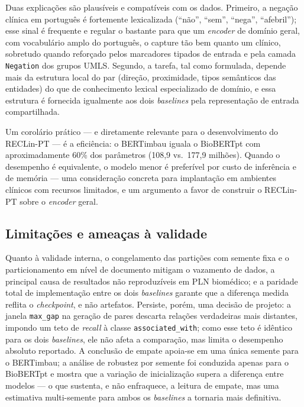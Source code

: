 \documentclass[12pt]{article}
\begin{document}
Duas explicações são plausíveis e compatíveis com os dados. Primeiro, a negação
clínica em português é fortemente lexicalizada (``não'', ``sem'', ``nega'',
``afebril''); esse sinal é frequente e regular o bastante para que um
\emph{encoder} de domínio geral, com vocabulário amplo do português, o capture
tão bem quanto um clínico, sobretudo quando reforçado pelos marcadores tipados de
entrada e pela camada \texttt{Negation} dos grupos UMLS. Segundo, a tarefa, tal
como formulada, depende mais da estrutura local do par (direção, proximidade,
tipos semânticos das entidades) do que de conhecimento lexical especializado de
domínio, e essa estrutura é fornecida igualmente aos dois \emph{baselines} pela
representação de entrada compartilhada.

Um corolário prático --- e diretamente relevante para o desenvolvimento do
RECLin-PT --- é a eficiência: o BERTimbau iguala o BioBERTpt com aproximadamente
60\% dos parâmetros (108,9 vs.\ 177,9 milhões). Quando o desempenho é
equivalente, o modelo menor é preferível por custo de inferência e de memória ---
uma consideração concreta para implantação em ambientes clínicos com recursos
limitados, e um argumento a favor de construir o RECLin-PT sobre o \emph{encoder}
geral.

\subsection{Limitações e ameaças à validade}
Quanto à validade interna, o congelamento das partições com semente fixa e o
particionamento em nível de documento mitigam o vazamento de dados, a principal
causa de resultados não reproduzíveis em PLN biomédico; e a paridade total de
implementação entre os dois \emph{baselines} garante que a diferença medida
reflita o \emph{checkpoint}, e não artefatos. Persiste, porém, uma decisão de
projeto: a janela \texttt{max\_gap} na geração de pares descarta relações
verdadeiras mais distantes, impondo um teto de \emph{recall} à classe
\texttt{associated\_with}; como esse teto é idêntico para os dois \emph{baselines},
ele não afeta a comparação, mas limita o desempenho absoluto reportado. A
conclusão de empate apoia-se em uma única semente para o BERTimbau; a análise de
robustez por semente foi conduzida apenas para o BioBERTpt e mostra que a
variação de inicialização supera a diferença entre modelos --- o que sustenta, e
não enfraquece, a leitura de empate, mas uma estimativa multi-semente para ambos
os \emph{baselines} a tornaria mais definitiva.
\end{document}

